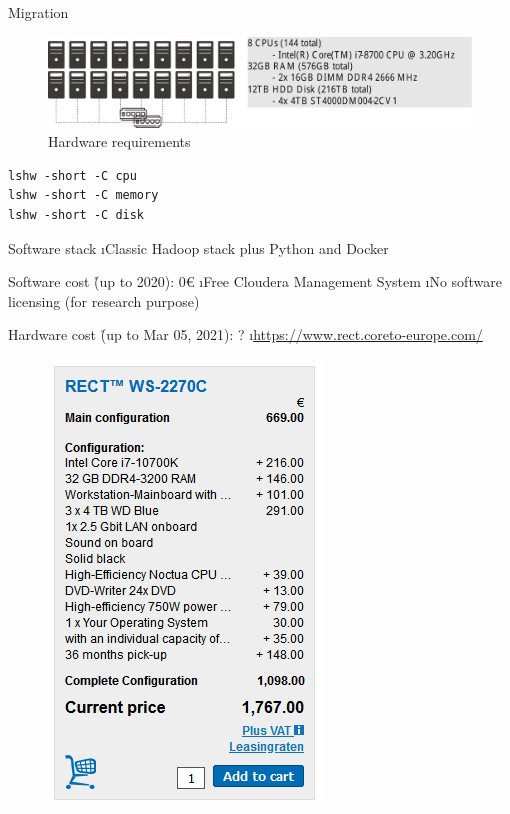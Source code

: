 \begin{frame}{Migration}
\framebreak

\begin{figure}
    \centering
    \includegraphics[scale=.5]{imgs/migration0.pdf}
    \caption{Hardware requirements}
\end{figure}

\begin{lstlisting}
lshw -short -C cpu
lshw -short -C memory
lshw -short -C disk
\end{lstlisting}

Software stack
\i Classic Hadoop stack plus Python and Docker

\framebreak

Software cost \r{(up to 2020): 0\euro{}}
\i Free Cloudera Management System
\i No software licensing (for research purpose)

Hardware cost \r{(up to Mar 05, 2021): ?}
\i \url{https://www.rect.coreto-europe.com/}

\framebreak

\begin{figure}
    \centering
    \includegraphics[scale=.5]{imgs/migration_hw_onprem.PNG}
\end{figure}


\end{frame}
